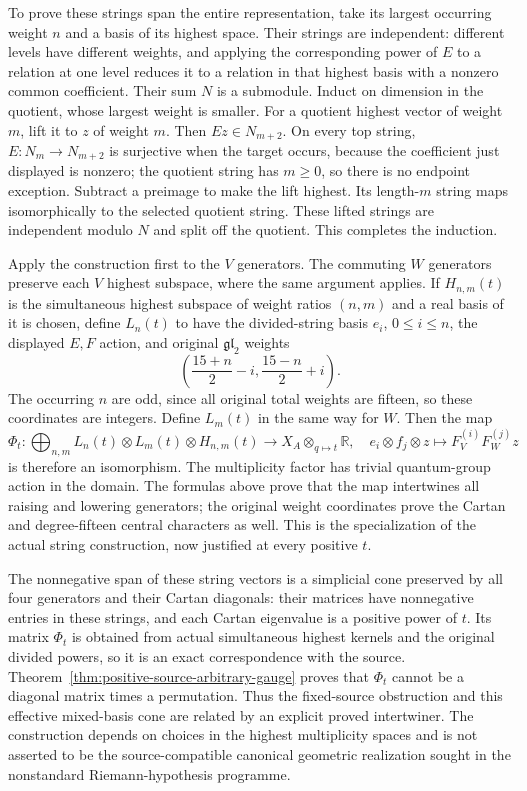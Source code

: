 To prove these strings span the entire representation, take its
largest occurring weight $n$ and a basis of its highest space.
Their strings are independent: different levels have different
weights, and applying the corresponding power of $E$ to a relation
at one level reduces it to a relation in that highest basis with a
nonzero common coefficient. Their sum $N$ is a submodule. Induct
on dimension in the quotient, whose largest weight is smaller.
For a quotient highest vector of weight $m$, lift it to $z$ of
weight $m$. Then $Ez\in N_{m+2}$. On every top string,
$E:N_m\to N_{m+2}$ is surjective when the target occurs, because
the coefficient just displayed is nonzero; the quotient string
has $m\geq0$, so there is no endpoint exception. Subtract a
preimage to make the lift highest. Its length-$m$ string maps
isomorphically to the selected quotient string. These lifted
strings are independent modulo $N$ and split off the quotient.
This completes the induction.

Apply the construction first to the $V$ generators. The commuting
$W$ generators preserve each $V$ highest subspace, where the same
argument applies. If $H_{n,m}(t)$ is the simultaneous highest
subspace of weight ratios $(n,m)$ and a real basis of it is chosen,
define $L_n(t)$ to have the divided-string basis $e_i$, $0\leq i\leq n$,
the displayed $E,F$ action, and original $\mathfrak{gl}_2$ weights
\[
 \left(\frac{15+n}{2}-i,\frac{15-n}{2}+i\right).
\]
The occurring $n$ are odd, since all original total weights are
fifteen, so these coordinates are integers. Define $L_m(t)$ in
the same way for $W$. Then the map
\[
 \Phi_t:\bigoplus_{n,m} L_n(t)\otimes L_m(t)\otimes H_{n,m}(t)
       \longrightarrow X_A\otimes_{q\mapsto t}\mathbb R,
 \quad e_i\otimes f_j\otimes z\longmapsto
              F_V^{(i)}F_W^{(j)}z
\]
is therefore an isomorphism. The multiplicity factor has trivial
quantum-group action in the domain. The formulas above prove that
the map intertwines all raising and lowering generators; the
original weight coordinates prove the Cartan and degree-fifteen
central characters as well. This is the specialization of the
actual string construction, now justified at every positive $t$.

The nonnegative span of these string vectors is a simplicial cone
preserved by all four generators and their Cartan diagonals: their
matrices have nonnegative entries in these strings, and each Cartan
eigenvalue is a positive power of $t$. Its matrix $\Phi_t$ is
obtained from actual simultaneous highest kernels and the original
divided powers, so it is an exact correspondence with the source.
Theorem~\ref{thm:positive-source-arbitrary-gauge} proves that
$\Phi_t$ cannot be a diagonal matrix times a permutation. Thus the
fixed-source obstruction and this effective mixed-basis cone are
related by an explicit proved intertwiner. The construction depends
on choices in the highest multiplicity spaces and is not asserted
to be the source-compatible canonical geometric realization sought
in the nonstandard Riemann-hypothesis programme.

